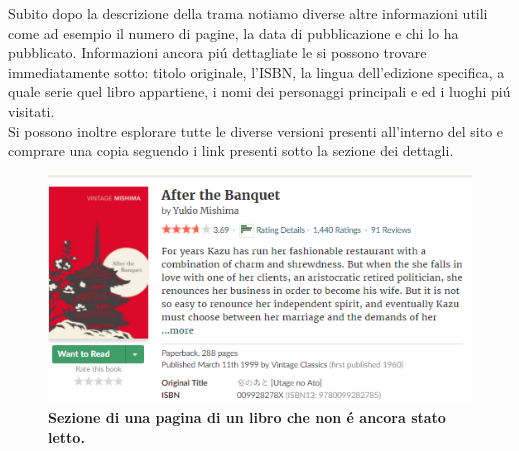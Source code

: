 \documentclass[12pt]{article}
\begin{document}
Subito dopo la descrizione della trama notiamo diverse altre informazioni utili come ad esempio il numero di pagine, la data di pubblicazione e chi lo ha pubblicato. Informazioni ancora pi\'u dettagliate le si possono trovare immediatamente sotto: titolo originale, l'ISBN, la lingua dell'edizione specifica, a quale serie quel libro appartiene, i nomi dei personaggi principali e ed i luoghi pi\'u visitati. \\Si possono inoltre esplorare tutte le diverse versioni presenti all'interno del sito e comprare una copia seguendo i link presenti sotto la sezione dei dettagli.\\

\begin{figure}
	\centering 
	\includegraphics[width=16.5cm]{resources/book_notread.png}
	\caption{\textbf{Sezione di una pagina di un libro che non \'e ancora stato letto.}}
\end{figure}
\end{document}
